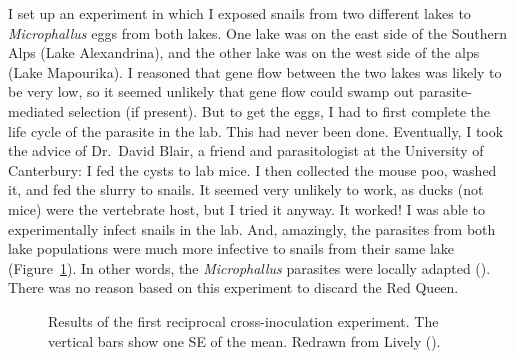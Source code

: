 \documentclass[
  letterpaper,
]{book}
\begin{document}
I set up an experiment in which I exposed snails from two different
lakes to \emph{Microphallus} eggs from both lakes. One lake was on the
east side of the Southern Alps (Lake Alexandrina), and the other lake
was on the west side of the alps (Lake Mapourika). I reasoned that gene
flow between the two lakes was likely to be very low, so it seemed
unlikely that gene flow could swamp out parasite-mediated selection (if
present). But to get the eggs, I had to first complete the life cycle of
the parasite in the lab. This had never been done. Eventually, I took
the advice of Dr.~David Blair, a friend and parasitologist at the
University of Canterbury: I fed the cysts to lab mice. I then collected
the mouse poo, washed it, and fed the slurry to snails. It seemed very
unlikely to work, as ducks (not mice) were the vertebrate host, but I
tried it anyway. It worked! I was able to experimentally infect snails
in the lab. And, amazingly, the parasites from both lake populations
were much more infective to snails from their same lake
(Figure~\ref{fig-4.3}). In other words, the \emph{Microphallus}
parasites were locally adapted (). There was no reason based on this experiment to discard the Red
Queen.

\begin{figure}


\caption[Results of the first reciprocal cross-inoculation
experiment]{\label{fig-4.3}Results of the first reciprocal
cross-inoculation experiment. The vertical bars show one SE of the mean.
Redrawn from Lively ().}

\end{figure}%
\end{document}
